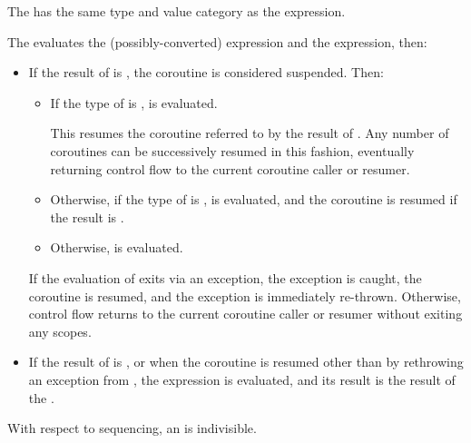 \pnum
The  has the same type and value category
as the  expression.

\pnum
The  evaluates
the (possibly-converted)  expression and
the  expression, then:
\begin{itemize}
\item
If the result of  is ,
the coroutine is considered suspended.
Then:
\begin{itemize}
\item
If the type of 
is ,
 is evaluated.
\begin{note}
This resumes the coroutine referred to
by the result of .
Any number of coroutines can be successively resumed in this fashion,
eventually returning control flow to the current coroutine caller or
resumer.
\end{note}

\item
Otherwise, if the type of 
is ,
 is evaluated,
and the coroutine is resumed if the result is .

\item
Otherwise,  is evaluated.
\end{itemize}
If the evaluation of 
exits via an exception, the exception is caught,
the coroutine is resumed, and the exception is immediately
re-thrown. Otherwise, control flow returns
to the current coroutine caller or resumer
without exiting any scopes.

\item
If the result of  is ,
or when the coroutine is resumed
other than by rethrowing an exception from ,
the  expression is evaluated, and
its result is the result of the .
\end{itemize}
\begin{note}
With respect to sequencing,
an  is indivisible.
\end{note}

